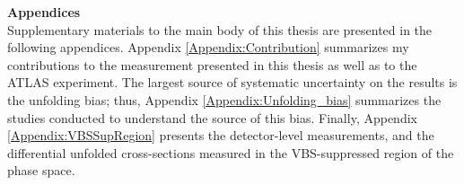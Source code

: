 \documentclass[red]{brandeis-dissertation}
\numberwithin{equation}{section}
\begin{document}
\startbody

\renewcommand{\partname}{Chapter}


\clearpage


	
	
	
	
\clearpage


	
	
	
	
\clearpage


	
	
	
	
	
	
\clearpage


\clearpage


\clearpage


\clearpage

% 
% 	
% 	

{\singlespacing
\renewcommand{\refname}{References}


\clearpage
}

\begin{appendices}
   \LARGE{\textbf{Appendices}} \\ 
   \normalsize 
   Supplementary materials to the main body of this thesis are presented in the following appendices. Appendix \ref{Appendix:Contribution} summarizes my contributions to the measurement presented in this thesis as well as to the ATLAS experiment. The largest source of systematic uncertainty on the results is the unfolding bias; thus, Appendix \ref{Appendix:Unfolding_bias} summarizes the studies conducted to understand the source of this bias. Finally, Appendix \ref{Appendix:VBSSupRegion} presents the detector-level measurements, and the differential unfolded cross-sections measured in the VBS-suppressed region of the phase space. 
 

	
\end{appendices}
\end{document}
